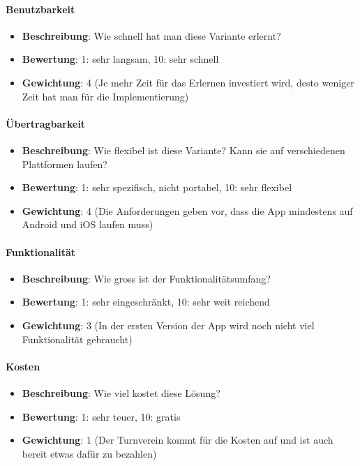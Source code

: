 \paragraph{Benutzbarkeit}
\begin{itemize}
	\item \textbf{Beschreibung}: Wie schnell hat man diese Variante erlernt? 
	\item \textbf{Bewertung}: 1: sehr langsam, 10: sehr schnell
	\item \textbf{Gewichtung}: 4 (Je mehr Zeit für das Erlernen investiert wird, desto weniger Zeit hat man für die Implementierung)
\end{itemize}

\paragraph{Übertragbarkeit}
\begin{itemize}
	\item \textbf{Beschreibung}: Wie flexibel ist diese Variante? Kann sie auf verschiedenen Plattformen laufen? 
	\item \textbf{Bewertung}: 1: sehr spezifisch, nicht portabel, 10: sehr flexibel
	\item \textbf{Gewichtung}: 4 (Die Anforderungen geben vor, dass die App mindestens auf Android und iOS laufen muss)
\end{itemize}

\paragraph{Funktionalität}
\begin{itemize}
	\item \textbf{Beschreibung}: Wie gross ist der Funktionalitätsumfang? 
	\item \textbf{Bewertung}: 1: sehr eingeschränkt, 10: sehr weit reichend
	\item \textbf{Gewichtung}: 3 (In der ersten Version der App wird noch nicht viel Funktionalität gebraucht)
\end{itemize}

\paragraph{Kosten}
\begin{itemize}
	\item \textbf{Beschreibung}: Wie viel kostet diese Lösung? 
	\item \textbf{Bewertung}: 1: sehr teuer, 10: gratis
	\item \textbf{Gewichtung}: 1 (Der Turnverein kommt für die Kosten auf und ist auch bereit etwas dafür zu bezahlen)
\end{itemize}

